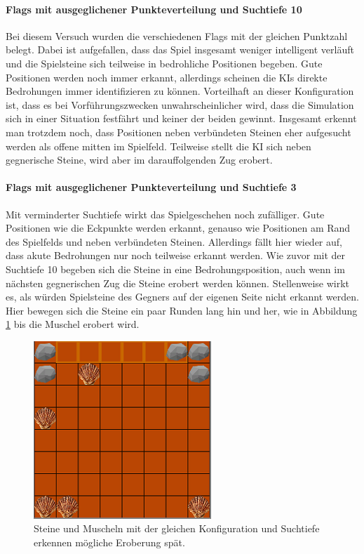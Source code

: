 \paragraph{Flags mit ausgeglichener Punkteverteilung und Suchtiefe 10}
Bei diesem Versuch wurden die verschiedenen Flags mit der gleichen Punktzahl belegt. Dabei ist aufgefallen, dass das Spiel insgesamt weniger intelligent verläuft und die Spielsteine sich teilweise in bedrohliche Positionen begeben. Gute Positionen werden noch immer erkannt, allerdings scheinen die KIs direkte Bedrohungen immer identifizieren zu können. Vorteilhaft an dieser Konfiguration ist, dass es bei Vorführungszwecken unwahrscheinlicher wird, dass die Simulation sich in einer Situation festfährt und keiner der beiden gewinnt. Insgesamt erkennt man trotzdem noch, dass Positionen neben verbündeten Steinen eher aufgesucht werden als offene mitten im Spielfeld. Teilweise stellt die KI sich neben gegnerische Steine, wird aber im darauffolgenden Zug erobert. 

\paragraph{Flags mit ausgeglichener Punkteverteilung und Suchtiefe 3}
Mit verminderter Suchtiefe wirkt das Spielgeschehen noch zufälliger. Gute Positionen wie die Eckpunkte werden erkannt, genauso wie Positionen am Rand des Spielfelds und neben verbündeten Steinen. Allerdings fällt hier wieder auf, dass akute Bedrohungen nur noch teilweise erkannt werden. Wie zuvor mit der Suchtiefe 10 begeben sich die Steine in eine Bedrohungsposition, auch wenn im nächsten gegnerischen Zug die Steine erobert werden können. Stellenweise wirkt es, als würden Spielsteine des Gegners auf der eigenen Seite nicht erkannt werden. Hier bewegen sich die Steine ein paar Runden lang hin und her, wie in Abbildung \ref{fig:hinundherboth} bis die Muschel erobert wird.
\begin{figure}[h]
	\centering
	\includegraphics{img/both/muschelnichterkannt}

	\caption{Steine und Muscheln mit der gleichen Konfiguration und Suchtiefe erkennen mögliche Eroberung spät.}
	\label{fig:hinundherboth}
\end{figure}

